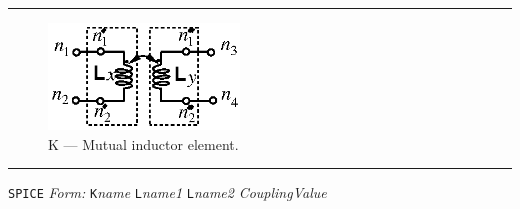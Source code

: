 \documentclass{article}
\begin{document}
\\
\normalsize
\newline
\rule{\textwidth}{0.5mm}

\normalsize
\begin{figure}[h]
\centerline{\includegraphics[width=2in]{k_spice.ps}} \caption{K --- Mutual
inductor element.}
\end{figure}


\noindent\rule{\textwidth}{0.5mm}
\newline
\texttt{SPICE} \textit{Form:}
\newline
{\tt K}{\it name} {\tt L}{\it name1} {\tt L}{\it name2} {\it
CouplingValue}
\newline
\end{document}
